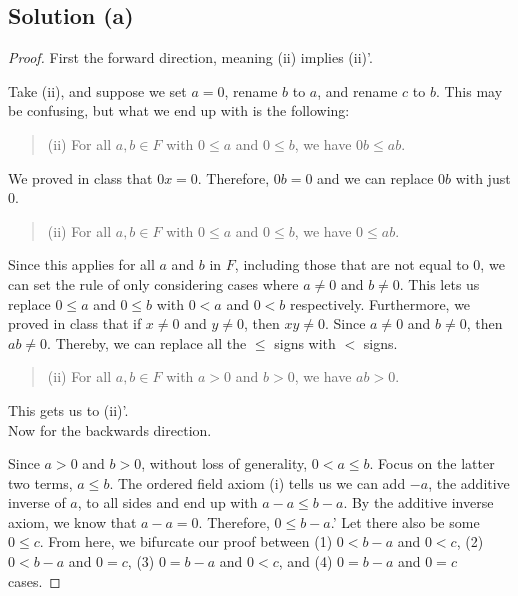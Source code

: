 \documentclass[11pt]{article}
\begin{document}
    \subsection{Solution (a)}
    \begin{proof}
        First the forward direction, meaning (ii) implies (ii)'.
        
        Take (ii), and suppose we set $a = 0$, rename $b$ to $a$, and rename $c$ to $b$.
        This may be confusing, but what we end up with is the following:
        \begin{quote}
            (ii) For all $a, b \in F$ with $0 \leq a$ and $0 \leq b$, we have $0b \leq ab$.
        \end{quote}
        
        We proved in class that $0x = 0$.
        Therefore, $0b = 0$ and we can replace $0b$ with just $0$.
        \begin{quote}
            (ii) For all $a, b \in F$ with $0 \leq a$ and $0 \leq b$, we have $0 \leq ab$.
        \end{quote}

        Since this applies for all $a$ and $b$ in $F$, including those that are not equal to $0$, we can set the rule of only considering cases where $a \neq 0$ and $b \neq 0$.
        This lets us replace $0 \leq a$ and $0 \leq b$ with $0 < a$ and $0 < b$ respectively. 
        Furthermore, we proved in class that if $x \neq 0$ and $y \neq 0$, then $xy \neq 0$.
        Since $a \neq 0$ and $b \neq 0$, then $ab \neq 0$.
        Thereby, we can replace all the $\leq$ signs with $<$ signs.
        \begin{quote}
            (ii) For all $a, b \in F$ with $a > 0$ and $b > 0$, we have $ab > 0$.
        \end{quote}

        This gets us to (ii)'.\\
        Now for the backwards direction.
        
        Since $a > 0$ and $b > 0$, without loss of generality, $0 < a \leq b$.
        Focus on the latter two terms, $a \leq b$.
        The ordered field axiom (i) tells us we can add $-a$, the additive inverse of $a$, to all sides and end up with $a - a \leq b - a$.
        By the additive inverse axiom, we know that $a - a = 0$.
        Therefore, $0 \leq b - a$.'
        Let there also be some $0 \leq c$.
        From here, we bifurcate our proof between (1) $0 < b - a$ and $0 < c$, (2) $0 < b - a$ and $0 = c$, (3) $0 = b - a$ and $0 < c$, and (4) $0 = b - a$ and $0 = c$ cases.


\end{proof}
\end{document}
